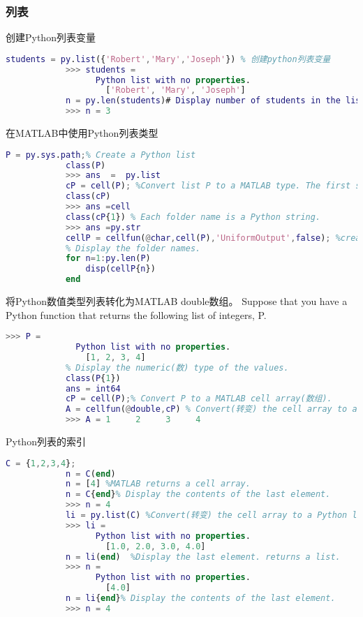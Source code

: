         \subsubsection{列表}
            \par
            创建Python列表变量
            \begin{lstlisting}[language = Matlab]
            students = py.list({'Robert','Mary','Joseph'}) % 创建python列表变量
            >>> students =
                  Python list with no properties.
                    ['Robert', 'Mary', 'Joseph']
            n = py.len(students)# Display number of students in the list.
            >>> n = 3
            \end{lstlisting}
            在MATLAB中使用Python列表类型
            \begin{lstlisting}[language  = Matlab]
            P = py.sys.path;% Create a Python list
            class(P)
            >>> ans  =  py.list
            cP = cell(P); %Convert list P to a MATLAB type. The first step is to convert(转变) the list to a cell array(数组) of folder names, cP.
            class(cP)
            >>> ans =cell
            class(cP{1}) % Each folder name is a Python string.
            >>> ans =py.str
            cellP = cellfun(@char,cell(P),'UniformOutput',false); %create cellP using the cellfun function to combine the conversion(转换) functions.
            % Display the folder names.
            for n=1:py.len(P)
                disp(cellP{n})
            end
            \end{lstlisting}
            将Python数值类型列表转化为MATLAB double数组。
            Suppose that you have a Python function that returns the following list of integers, P.
            \begin{lstlisting}[language = Matlab]
            >>> P =
              Python list with no properties.
                [1, 2, 3, 4]
            % Display the numeric(数) type of the values.
            class(P{1})
            ans = int64
            cP = cell(P);% Convert P to a MATLAB cell array(数组).
            A = cellfun(@double,cP) % Convert(转变) the cell array to a MATLAB array of double.
            >>> A = 1     2     3     4
            \end{lstlisting}
            Python列表的索引
            \begin{lstlisting}[language = Matlab]
            C = {1,2,3,4};
            n = C(end)
            n = [4] %MATLAB returns a cell array.
            n = C{end}% Display the contents of the last element.
            >>> n = 4
            li = py.list(C) %Convert(转变) the cell array to a Python list.
            >>> li =
                  Python list with no properties.
                    [1.0, 2.0, 3.0, 4.0]
            n = li(end)  %Display the last element. returns a list.
            >>> n =
                  Python list with no properties.
                    [4.0]
            n = li{end}% Display the contents of the last element.
            >>> n = 4
            \end{lstlisting}
